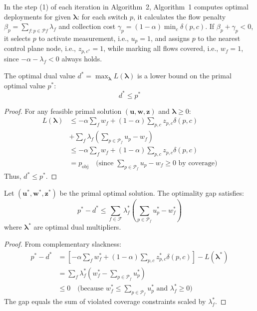 In the step (1) of each iteration in Algorithm~2, Algorithm~1 computes optimal deployments for given $\boldsymbol{\lambda}$: for each switch $p$, it calculates the flow penalty $\beta_p = \sum_{f: p \in \mathcal{P}f} \lambda_f$ and collection cost $\gamma_p = (1-\alpha) \min_c \delta(p,c)$. If $\beta_p + \gamma_p < 0$, it selects $p$ to activate measurement, i.e., $u_p=1$, and assigns $p$ to the nearest control plane node, i.e., $z_{p,c^*}=1$, while marking all flows covered, i.e., $w_f=1$, since $-\alpha - \lambda_f < 0$ always holds.

\begin{theorem}
\label{thm:weak-duality}
The optimal dual value \(d^* = \max_{\boldsymbol{\lambda}} L(\boldsymbol{\lambda})\) is a lower bound on the primal optimal value \(p^*\):
\[
d^* \leq p^*
\]
\end{theorem}

\begin{proof}
For any feasible primal solution \((\mathbf{u},\mathbf{w},\mathbf{z})\) and \(\boldsymbol{\lambda} \geq 0\):
\[
\begin{aligned}
L(\boldsymbol{\lambda}) &\leq -\alpha \sum_f w_f + (1-\alpha) \sum_{p,c} z_{p,c} \delta(p,c) \\
&+ \sum_f \lambda_f \left( \sum_{p \in \mathcal{P}_f} u_p - w_f \right) \\
&\leq -\alpha \sum_f w_f + (1-\alpha) \sum_{p,c} z_{p,c} \delta(p,c) \\
&= p_{\text{obj}} \quad \text{(since } \sum_{p \in \mathcal{P}_f} u_p - w_f \geq 0 \text{ by coverage)}
\end{aligned}
\]
Thus, \(d^* \leq p^*\).
\end{proof}

\begin{theorem}
\label{thm:optimality-gap}
Let \((\mathbf{u}^*,\mathbf{w}^*,\mathbf{z}^*)\) be the primal optimal solution. The optimality gap satisfies:
\[
p^* - d^* \leq \sum_{f \in \mathcal{F}} \lambda_f^* \left( \sum_{p \in \mathcal{P}_f} u_p^* - w_f^* \right)
\]
where \(\boldsymbol{\lambda}^*\) are optimal dual multipliers.
\end{theorem}

\begin{proof}
From complementary slackness:
\[
\begin{aligned}
p^* - d^* &= \left[ -\alpha \sum_f w_f^* + (1-\alpha) \sum_{p,c} z_{p,c}^* \delta(p,c) \right] - L(\boldsymbol{\lambda}^*) \\
&= \sum_f \lambda_f^* \left( w_f^* - \sum_{p \in \mathcal{P}_f} u_p^* \right) \\
&\leq 0 \quad \text{(because } w_f^* \leq \sum_{p \in \mathcal{P}_f} u_p^* \text{ and } \lambda_f^* \geq 0\text{)}
\end{aligned}
\]
The gap equals the sum of violated coverage constraints scaled by \(\lambda_f^*\).
\end{proof}


